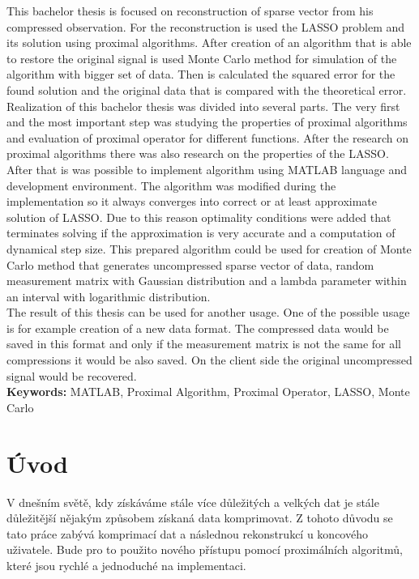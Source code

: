 \documentclass[FM,BP]{tulthesis}
\begin{document}
\vspace{2cm}
\begin{abstractEN}
This bachelor thesis is focused on reconstruction of sparse vector from his compressed observation. For the reconstruction is used the LASSO problem and its solution using proximal algorithms. After creation of an algorithm that is able to restore the original signal is used Monte Carlo method for simulation of the algorithm with bigger set of data. Then is calculated the squared error for the found solution and the original data that is compared with the theoretical error.
\\

Realization of this bachelor thesis was divided into several parts. The very first and the most important step was studying the properties of proximal algorithms and evaluation of proximal operator for different functions. After the research on proximal algorithms there was also research on the properties of the LASSO. After that is was possible to implement algorithm using MATLAB language and development environment. The algorithm was modified during the implementation so it always converges into correct or at least approximate solution of LASSO. Due to this reason optimality conditions were added that terminates solving if the approximation is very accurate and a computation of dynamical step size. This prepared algorithm could be used for creation of Monte Carlo method that generates uncompressed sparse vector of data, random measurement matrix with Gaussian distribution and a lambda parameter within an interval with logarithmic distribution.
\\

The result of this thesis can be used for another usage. One of the possible usage is for example creation of a new data format. The compressed data would be saved in this format and only if the measurement matrix is not the same for all compressions it would be also saved. On the client side the original uncompressed signal would be recovered.
\\

\textbf{Keywords:} MATLAB, Proximal Algorithm, Proximal Operator, LASSO, Monte Carlo
\end{abstractEN}
\clearpage
\tableofcontents
\listoffigures
\listoftables
\pagebreak
\renewcommand{\baselinestretch}{1.5}
\setlength\parindent{1.2cm}
\selectfont
\chapter{Úvod}
V dnešním světě, kdy získáváme stále více důležitých a velkých dat je stále důležitější nějakým způsobem získaná data komprimovat. Z tohoto důvodu se tato práce zabývá komprimací dat a následnou rekonstrukcí u koncového uživatele. Bude pro to použito nového přístupu pomocí proximálních algoritmů, které jsou rychlé a jednoduché na implementaci.
\end{document}
